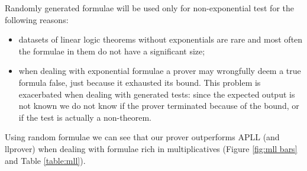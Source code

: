 Randomly generated formulae will be used only for non-exponential test for the following reasons:
\begin{itemize}
	\item datasets of linear logic theorems without exponentials are rare and most often the formulae in them do not have a significant size; 
	\item when dealing with exponential formulae a prover may wrongfully deem a true formula false, just because it exhausted its bound.
		This problem is exacerbated when dealing with generated tests: since the expected output is not known we do not know if the prover terminated because of the bound, or if the test is actually a non-theorem.
\end{itemize}

Using random formulae we can see that our prover outperforms APLL (and llprover) when dealing with formulae rich in multiplicatives (Figure \ref{fig:mll bars} and Table \ref{table:mll}).
